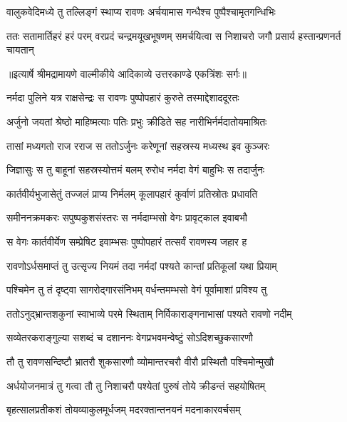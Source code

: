 \twolineshloka
{वालुकवेदिमध्ये तु तल्लिङ्गं स्थाप्य रावणः}
{अर्चयामास गन्धैश्च पुष्पैश्चामृतगन्धिभिः} %

\fourlineindentedshloka
{ततः सतामार्तिहरं हरं परम्}
{वरप्रदं चन्द्रमयूखभूषणम्}
{समर्चयित्वा स निशाचरो जगौ}
{प्रसार्य हस्तान्प्रणनर्त चायतान्} %


{॥इत्यार्षे श्रीमद्रामायणे वाल्मीकीये आदिकाव्ये उत्तरकाण्डे एकत्रिंशः सर्गः॥}


\twolineshloka
{नर्मदा पुलिने यत्र राक्षसेन्द्रः स रावणः}
{पुष्पोपहारं कुरुते तस्माद्देशाददूरतः} %

\twolineshloka
{अर्जुनो जयतां श्रेष्ठो माहिष्मत्याः पतिः प्रभुः}
{क्रीडिते सह नारीभिर्नर्मदातोयमाश्रितः} %

\twolineshloka
{तासां मध्यगतो राज रराज स ततोऽर्जुनः}
{करेणूनां सहस्रस्य मध्यस्थ इव कुञ्जरः} %

\twolineshloka
{जिज्ञासुः स तु बाहूनां सहस्रस्योत्तमं बलम्}
{रुरोध नर्मदा वेगं बाहुभिः स तदार्जुनः} %

\twolineshloka
{कार्तवीर्यभुजासेतुं तज्जलं प्राप्य निर्मलम्}
{कूलापहारं कुर्वाणं प्रतिस्रोतः प्रधावति} %

\twolineshloka
{समीननक्रमकरः सपुष्पकुशसंस्तरः}
{स नर्मदाम्भसो वेगः प्रावृट्काल इवाबभौ} %

\twolineshloka
{स वेगः कार्तवीर्येण सम्प्रेषिट इवाम्भसः}
{पुष्पोपहारं तत्सर्वं रावणस्य जहार ह} %

\twolineshloka
{रावणोऽर्धसमाप्तं तु उत्सृज्य नियमं तदा}
{नर्मदां पश्यते कान्तां प्रतिकूलां यथा प्रियाम्} %

\twolineshloka
{पश्चिमेन तु तं दृष्ट्वा सागरोद्गारसंनिभम्}
{वर्धन्तमम्भसो वेगं पूर्वामाशां प्रविश्य तु} %

\twolineshloka
{ततोऽनुद्भ्रान्तशकुनां स्वाभाव्ये परमे स्थिताम्}
{निर्विकाराङ्गनाभासां पश्यते रावणो नदीम्} %

\twolineshloka
{सव्येतरकराङ्गुल्या सशब्दं च दशाननः}
{वेगप्रभवमन्वेष्टुं सोऽदिशच्छुकसारणौ} %

\twolineshloka
{तौ तु रावणसन्दिष्टौ भ्रातरौ शुकसारणौ}
{व्योमान्तरचरौ वीरौ प्रस्थितौ पश्चिमोन्मुखौ} %

\twolineshloka
{अर्धयोजनमात्रं तु गत्वा तौ तु निशाचरौ}
{पश्येतां पुरुषं तोये क्रीडन्तं सहयोषितम्} %

\twolineshloka
{बृहत्सालप्रतीकशं तोयव्याकुलमूर्धजम्}
{मदरक्तान्तनयनं मदनाकारवर्चसम्} %

